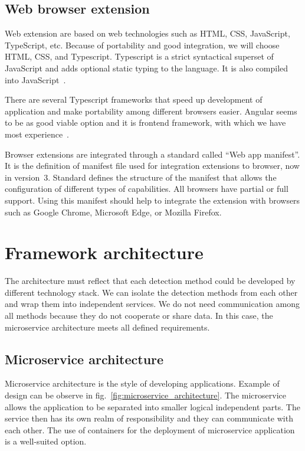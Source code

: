 \section{Web browser extension}

Web extension are based on web technologies such as HTML, CSS, JavaScript, TypeScript, etc. Because of portability and good integration, we will choose HTML, CSS, and Typescript. Typescript is a strict syntactical superset of JavaScript and adds optional static typing to the language. It is also compiled into JavaScript~\cite{Typescript}.

There are several Typescript frameworks that speed up development of application and make portability among different browsers easier. Angular seems to be as good viable option and it is frontend framework, with which we have most experience~\cite{Angular}.

Browser extensions are integrated through a standard called “Web app manifest”. It is the definition of manifest file used for integration extensions to browser, now in version~3. Standard defines the structure of the manifest that allows the configuration of different types of capabilities.  All browsers have partial or full support. Using this manifest should help to integrate the extension with browsers such as Google Chrome, Microsoft Edge, or Mozilla Firefox.~\cite{WebAppManifest}

\chapter{Framework architecture}

The architecture must reflect that each detection method could be developed by different technology stack. We can isolate the detection methods from each other and wrap them into independent services. We do not need communication among all methods because they do not cooperate or share data. In this case, the microservice architecture meets all defined requirements.

\section{Microservice architecture}

Microservice architecture is the style of developing applications. Example of design can be observe in fig.~\ref{fig:microservice_architecture}. The microservice allows the application to be separated into smaller logical independent parts. The service then has its own realm of responsibility and they can communicate with each other. The use of containers for the deployment of microservice application is a well-suited option.~\cite{WhatIsMicroservicesArchitecture}

